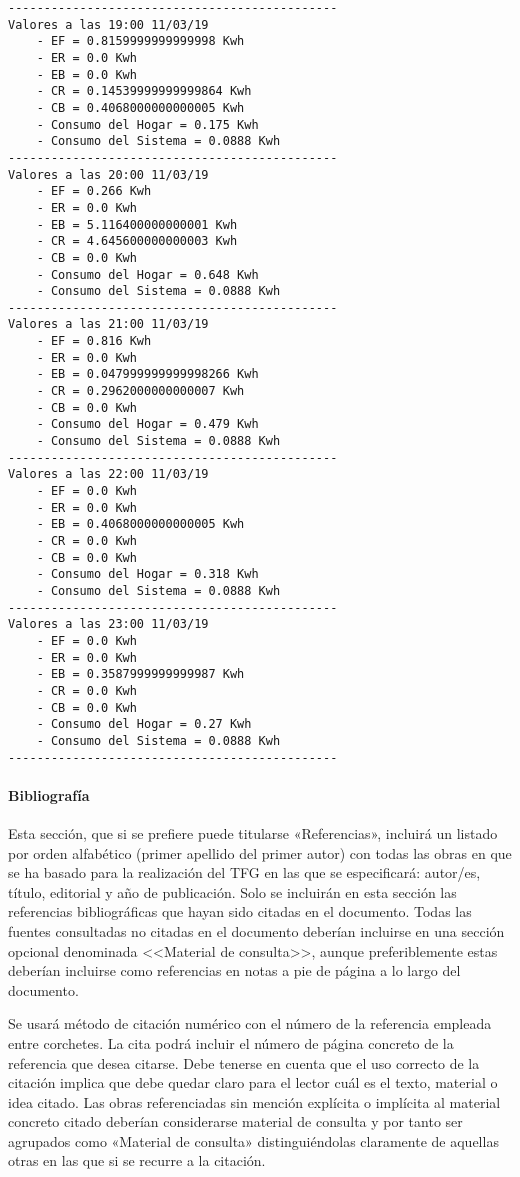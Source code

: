 \begin{lstlisting}[numbers=none,caption={Reporte de simulación 11/04},label={lst:simulationReport}]
----------------------------------------------
Valores a las 19:00 11/03/19
	- EF = 0.8159999999999998 Kwh
	- ER = 0.0 Kwh
	- EB = 0.0 Kwh
	- CR = 0.14539999999999864 Kwh
	- CB = 0.4068000000000005 Kwh
	- Consumo del Hogar = 0.175 Kwh
	- Consumo del Sistema = 0.0888 Kwh
----------------------------------------------
Valores a las 20:00 11/03/19
	- EF = 0.266 Kwh
	- ER = 0.0 Kwh
	- EB = 5.116400000000001 Kwh
	- CR = 4.645600000000003 Kwh
	- CB = 0.0 Kwh
	- Consumo del Hogar = 0.648 Kwh
	- Consumo del Sistema = 0.0888 Kwh
----------------------------------------------
Valores a las 21:00 11/03/19
	- EF = 0.816 Kwh
	- ER = 0.0 Kwh
	- EB = 0.047999999999998266 Kwh
	- CR = 0.2962000000000007 Kwh
	- CB = 0.0 Kwh
	- Consumo del Hogar = 0.479 Kwh
	- Consumo del Sistema = 0.0888 Kwh
----------------------------------------------
Valores a las 22:00 11/03/19
	- EF = 0.0 Kwh
	- ER = 0.0 Kwh
	- EB = 0.4068000000000005 Kwh
	- CR = 0.0 Kwh
	- CB = 0.0 Kwh
	- Consumo del Hogar = 0.318 Kwh
	- Consumo del Sistema = 0.0888 Kwh
----------------------------------------------
Valores a las 23:00 11/03/19
	- EF = 0.0 Kwh
	- ER = 0.0 Kwh
	- EB = 0.3587999999999987 Kwh
	- CR = 0.0 Kwh
	- CB = 0.0 Kwh
	- Consumo del Hogar = 0.27 Kwh
	- Consumo del Sistema = 0.0888 Kwh
----------------------------------------------
\end{lstlisting}

\paragraph{Bibliografía}

Esta sección, que si se prefiere puede titularse «Referencias», incluirá un listado por orden alfabético (primer apellido del primer autor) con todas las obras en que se ha basado para la realización del TFG en las que se especificará: autor/es, título, editorial y año de publicación. Solo se incluirán en esta sección las referencias bibliográficas que hayan sido citadas en el documento. Todas las fuentes consultadas no citadas en el documento deberían incluirse en una sección opcional denominada <<Material de consulta>>, aunque preferiblemente estas deberían incluirse como referencias en notas a pie de página a lo largo del documento.

Se usará método de citación numérico con el número de la referencia empleada entre corchetes. La cita podrá incluir el número de página concreto de la referencia que desea citarse. Debe tenerse en cuenta que el uso correcto de la citación implica que debe quedar claro para el lector cuál es el texto, material o idea citado. Las obras referenciadas sin mención explícita o implícita al material concreto citado deberían considerarse material de consulta y por tanto ser agrupados como «Material de consulta» distinguiéndolas claramente de aquellas otras en las que si se recurre a la citación.

